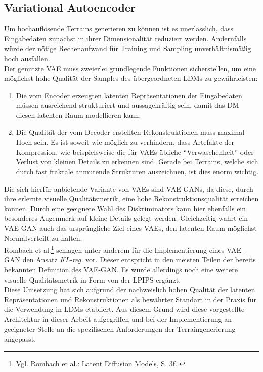 \subsection {Variational Autoencoder}

Um hochauflösende Terrains generieren zu können ist es unerlässlich, dass Eingabedaten zunächst in ihrer Dimensionalität reduziert werden. Andernfalls würde der nötige Rechenaufwand für Training und Sampling unverhältnismäßig hoch ausfallen. \\
Der genutzte \ac{VAE} muss zweierlei grundlegende Funktionen sicherstellen, um eine möglichst hohe Qualität der Samples des übergeordneten \ac{LDM}s zu gewährleisten:
\begin{enumerate}
    \item Die vom Encoder erzeugten latenten Repräsentationen der Eingabedaten müssen ausreichend strukturiert und aussagekräftig sein, damit das \ac{DM} diesen latenten Raum modellieren kann.  
    \item Die Qualität der vom Decoder erstellten Rekonstruktionen muss maximal Hoch sein. Es ist soweit wie möglich zu verhindern, dass Artefakte der Kompression, wie beispielsweise die für \ac{VAE}s übliche \enquote{Verwaschenheit} oder Verlust von kleinen Details zu erkennen sind. Gerade bei Terrains, welche sich durch fast fraktale anmutende Strukturen auszeichnen, ist dies enorm wichtig.
\end{enumerate}
Die sich hierfür anbietende Variante von \ac{VAE}s sind VAE-GANs, da diese, durch ihre erlernte visuelle Qualitätsmetrik, eine hohe Rekonstruktionsqualität erreichen können. Durch eine geeignete Wahl des Diskriminators kann hier ebenfalls ein besonderes Augenmerk auf kleine Details gelegt werden. Gleichzeitig wahrt ein VAE-GAN auch das ursprüngliche Ziel eines \ac{VAE}s, den latenten Raum möglichst Normalverteilt zu halten. \\
Rombach et al.\footnote{
    Vgl. Rombach et al.: Latent Diffusion Models, S. 3f. 
    \cite{rombach2022high}
} schlagen unter anderem für die Implementierung eines VAE-GAN den Ansatz \textit{KL-reg.} vor. Dieser entspricht in den meisten Teilen der bereits bekannten Definition des VAE-GAN. Es wurde allerdings noch eine weitere visuelle Qualitätsmetrik in Form von der \ac{LPIPS} ergänzt. \\
Diese Umsetzung hat sich aufgrund der nachweislich hohen Qualität der latenten Repräsentationen und Rekonstruktionen als bewährter Standart in der Praxis für die Verwendung in \ac{LDM}s etabliert. Aus diesem Grund wird diese vorgestellte Architektur in dieser Arbeit aufgegriffen und bei der Implementierung an geeigneter Stelle an die spezifischen Anforderungen der Terraingenerierung angepasst.

